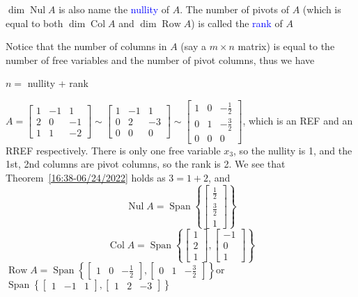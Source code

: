 \documentclass{beamer}
\DeclareMathOperator{\Nul}{Nul}
\DeclareMathOperator{\Col}{Col}
\DeclareMathOperator{\Row}{Row}
\theoremstyle{definition}
\theoremstyle{remark}
\DeclareMathOperator{\Span}{Span}
\begin{document}
\begin{frame}[t]
\begin{definition}
$\dim\Nul A$ is also name the \textcolor{blue}{nullity} of $A$. The number of pivots of $A$ (which is equal to both $\dim\Col A$ and $\dim\Row A$) is called the \textcolor{blue}{rank} of $A$
\end{definition}
\pause
\begin{theorem}\label{16:38-06/24/2022}
Notice that the number of columns in $A$ (say a $m\times n$ matrix) is equal to the number of free variables and the number of pivot columns, thus we have
\begin{center}
$n=$ nullity + rank
\end{center}
\end{theorem}
\end{frame}

\begin{frame}[t]
\begin{example}
$A=\begin{bmatrix}
1&-1&1\\
2&0&-1\\
1&1&-2
\end{bmatrix}\sim\begin{bmatrix}
1&-1&1\\
0&2&-3\\
0&0&0
\end{bmatrix}\sim\begin{bmatrix}
1&0&-\frac{1}{2}\\
0&1&-\frac{3}{2}\\
0&0&0
\end{bmatrix}$, which is an REF and an RREF respectively\pause. There is only one free variable $x_3$, so the nullity is 1\pause, and the 1st, 2nd columns are pivot columns, so the rank is 2\pause. We see that Theorem~\ref{16:38-06/24/2022} holds as $3=1+2$\pause, and
\[
\Nul A=\Span\left\{\begin{bmatrix}
\frac{1}{2}\\\frac{3}{2}\\1
\end{bmatrix}\right\}
\]\pause
\[
\Col A=\Span\left\{\begin{bmatrix}
1\\2\\1
\end{bmatrix},\begin{bmatrix}
-1\\0\\1
\end{bmatrix}\right\}
\]\pause
$\Row A=\Span\left\{\begin{bmatrix}
1&0&-\frac{1}{2}
\end{bmatrix},\begin{bmatrix}
0&1&-\frac{3}{2}
\end{bmatrix}\right\}$\pause or $\Span\left\{\begin{bmatrix}
1&-1&1
\end{bmatrix},\begin{bmatrix}
1&2&-3
\end{bmatrix}\right\}$
\end{example}
\end{frame}
\end{document}
